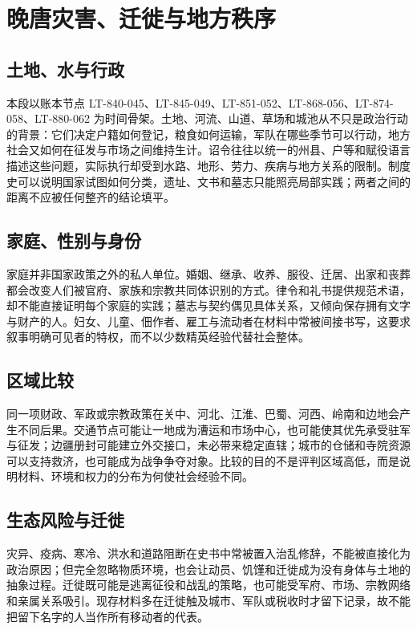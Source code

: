\section{晚唐灾害、迁徙与地方秩序}
\label{sec:late-tang-disaster-migration-local-order}

\subsection{土地、水与行政}
本段以账本节点 LT-840-045、LT-845-049、LT-851-052、LT-868-056、LT-874-058、LT-880-062 为时间骨架。土地、河流、山道、草场和城池从不只是政治行动的背景：它们决定户籍如何登记，粮食如何运输，军队在哪些季节可以行动，地方社会又如何在征发与市场之间维持生计。诏令往往以统一的州县、户等和赋役语言描述这些问题，实际执行却受到水路、地形、劳力、疾病与地方关系的限制。制度史可以说明国家试图如何分类，遗址、文书和墓志只能照亮局部实践；两者之间的距离不应被任何整齐的结论填平。

\subsection{家庭、性别与身份}
家庭并非国家政策之外的私人单位。婚姻、继承、收养、服役、迁居、出家和丧葬都会改变人们被官府、家族和宗教共同体识别的方式。律令和礼书提供规范术语，却不能直接证明每个家庭的实践；墓志与契约偶见具体关系，又倾向保存拥有文字与财产的人。妇女、儿童、佃作者、雇工与流动者在材料中常被间接书写，这要求叙事明确可见者的特权，而不以少数精英经验代替社会整体。

\subsection{区域比较}
同一项财政、军政或宗教政策在关中、河北、江淮、巴蜀、河西、岭南和边地会产生不同后果。交通节点可能让一地成为漕运和市场中心，也可能使其优先承受驻军与征发；边疆册封可能建立外交接口，未必带来稳定直辖；城市的仓储和寺院资源可以支持救济，也可能成为战争争夺对象。比较的目的不是评判区域高低，而是说明材料、环境和权力的分布为何使社会经验不同。

\subsection{生态风险与迁徙}
灾异、疫病、寒冷、洪水和道路阻断在史书中常被置入治乱修辞，不能被直接化为政治原因；但完全忽略物质环境，也会让动员、饥馑和迁徙成为没有身体与土地的抽象过程。迁徙既可能是逃离征役和战乱的策略，也可能受军府、市场、宗教网络和亲属关系吸引。现存材料多在迁徙触及城市、军队或税收时才留下记录，故不能把留下名字的人当作所有移动者的代表。

